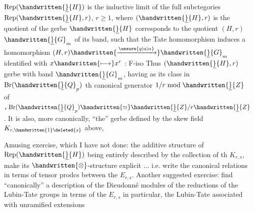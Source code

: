 $\operatorname{Rep}(\handwritten{\underline}{H})$ is the inductive limit of the full subctegories $\operatorname{Rep}(\handwritten{\underline}{H},r)$, $r\geq1$, where $(\handwritten{\underline}{H},r)$ is the quotient of the gerbe $\handwritten{\underline}{H}$ corresponds to the quotient $(H,r)$$\handwritten{\underline}{G}_m$ of its band, such that the Tate homomorphism  induces a homomorphism $(H,r)\handwritten{\xrightarrow{\unsure{q|a|\alpha}}}\handwritten{\underline}{G}_m$ identified with $x\handwritten{\longmapsto}x^r$ : F-iso Thus $(\handwritten{\underline}{H},r)$    gerbe with band $\handwritten{\underline}{G}_m$, having as its class in $\operatorname{Br}(\handwritten{\underline}{Q}_p)$ th canonical generator $1/r\bmod\handwritten{\underline}{Z}$ of ${}_r\operatorname{Br}(\handwritten{\underline}{Q}_p)\handwritten{\simeq}\handwritten{\underline}{Z}/r\handwritten{\underline}{Z}$. I\rlap{,}t is also, more canonically, ``the'' gerbe defined by the skew field $K_{r,\handwritten{1}\deleted{s}}$ above, 

\handwritten{[}Amusing exercise, which I have not done: the additive structure of $\operatorname{Rep}(\handwritten{\underline}{H})$ being entirely described by the collection of th $K_{r,s}$, make its $\handwritten{\otimes}$-structure explicit ... i.e. write the canonical relations in terms of tensor prodcs between the $E_{r,s}$. Another suggested exercise: find ``canonically'' a description of the Dieudonné modules of the reductions of the Lubin-Tate groups in terms of the $E_{r,s}$  \handwritten{(}in particular, the Lubin-Tate associated with unramified extensions
